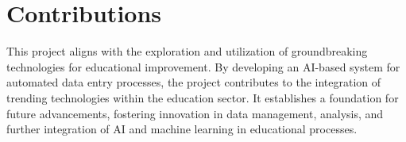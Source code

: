 \section{Contributions}

This project aligns with the exploration and utilization of groundbreaking technologies for educational improvement. By developing an AI-based system for automated data entry processes, the project contributes to the integration of trending technologies within the education sector. It establishes a foundation for future advancements, fostering innovation in data management, analysis, and further integration of AI and machine learning in educational processes.







